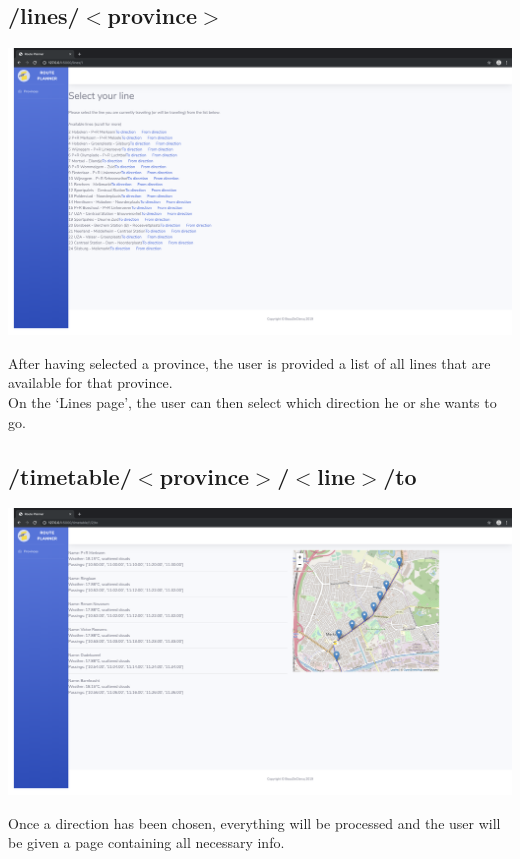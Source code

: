 \documentclass[12pt]{article}
\begin{document}
\subsection{/lines/$<$province$>$}
\begin{center}
	\includegraphics[width=\linewidth]{images/Select_line.png}
\end{center}
After having selected a province, the user is provided a list of all lines that are available for that province.\\
On the \lq Lines page\rq, the user can then select which direction he or she wants to go.

\subsection{/timetable/$<$province$>$/$<$line$>$/to}
\begin{center}
	\includegraphics[width=\linewidth]{images/Route_to.png}
\end{center}
Once a direction has been chosen, everything will be processed and  the user will be given a page containing all necessary info.
\end{document}
